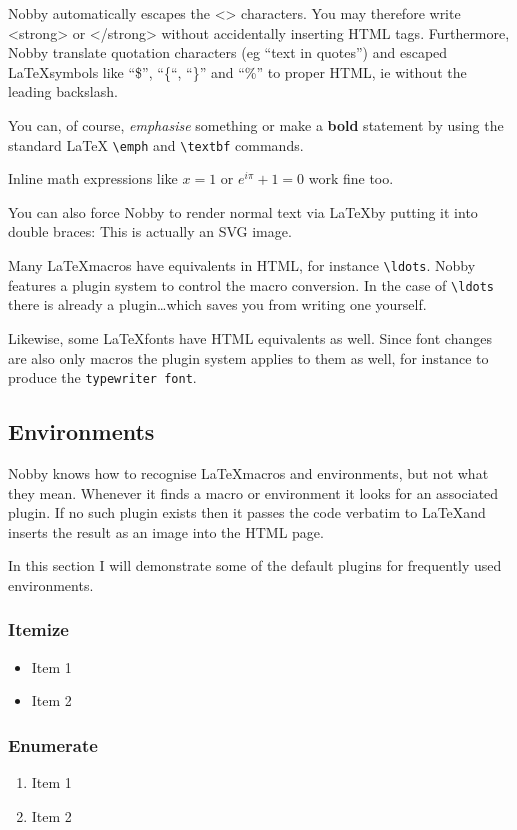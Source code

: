 \documentclass[10pt]{article}
\begin{document}
Nobby automatically escapes the <> characters. You may therefore
write <strong> or </strong> without accidentally inserting HTML tags.
Furthermore, Nobby translate quotation characters (eg ``text in quotes'') and
escaped \LaTeX symbols like ``\$'', ``\{``, ``\}'' and ``\%'' to proper HTML,
ie without the leading backslash.

You can, of course, \emph{emphasise} something or make a
\textbf{bold} statement by using the standard \LaTeX
\texttt{\textbackslash{emph}} and \texttt{\textbackslash{textbf}} commands.

Inline math expressions like $x=1$ or $e^{i\pi} + 1 = 0$ work fine too.

You can also force Nobby to render normal text via \LaTeX by putting it into
double braces: {{This is actually an SVG image.}}

Many \LaTeX macros have equivalents in HTML, for instance
\texttt{\textbackslash{ldots}}. Nobby features a plugin system to
control the macro conversion. In the case of \texttt{\textbackslash{ldots}}
there is already a plugin\ldots which saves you from writing one yourself.

Likewise, some \LaTeX fonts have HTML equivalents as well. Since font changes
are also only macros the plugin system applies to them as well, for instance
to produce the \texttt{typewriter font}.

\subsection{Environments}
Nobby knows how to recognise \LaTeX macros and environments, but not what they
mean. Whenever it finds a macro or environment it looks for an associated
plugin. If no such plugin exists then it passes the code verbatim to \LaTeX and
inserts the result as an image into the HTML page.

In this section I will demonstrate some of the default plugins for frequently
used environments.

\subsubsection{Itemize}
\begin{itemize}
\item Item 1
\item Item 2
\end{itemize}

\subsubsection{Enumerate}
\begin{enumerate}
\item Item 1
\item Item 2
\end{enumerate}
\end{document}
